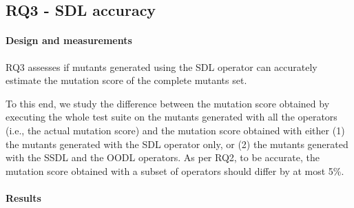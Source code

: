 \subsection{RQ3 - SDL accuracy}



\paragraph{Design and measurements}


RQ3 assesses if mutants generated using the SDL operator can accurately estimate the mutation score of the complete mutants set.

To this end, we study the difference between the mutation score obtained by executing the whole test suite on the mutants generated with all the operators (i.e., the actual mutation score) and the mutation score obtained with either (1) the mutants generated with the SDL operator only, or (2) the mutants generated with the SSDL and the OODL operators.
As per RQ2, to be accurate, the mutation score obtained with a subset of operators should differ by at most 5\%.




\paragraph{Results}



